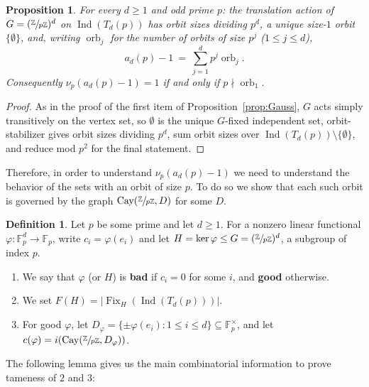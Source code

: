 \documentclass{article}
\theoremstyle{plain}
\newtheorem{proposition}[theorem]{Proposition}
\theoremstyle{definition}
\newtheorem{definition}[theorem]{Definition}
\theoremstyle{remark}
\newcommand{\Z}{\mathbb{Z}}
\newcommand{\F}{\mathbb{F}}
\newcommand{\quot}[2]{\sfrac{#1}{#2}}
\DeclareMathOperator{\Fix}{Fix}
\DeclareMathOperator{\Cay}{Cay}
\DeclareMathOperator{\Ind}{Ind}
\DeclareMathOperator{\orb}{orb}
\begin{document}
\begin{proposition}\label{prop:decompgeneral}
For every $d\ge1$ and odd prime $p$: the translation action of $G=(\quot{\Z}{p\Z})^d$ on $\Ind(T_d(p))$ has orbit sizes dividing $p^d$, a unique size-$1$ orbit $\{\emptyset\}$, and, writing $\orb_j$ for the number of orbits of size $p^j$ ($1\le j\le d$),
\[
a_d(p)-1\ =\ \sum_{j=1}^dp^j\orb_j.
\]
Consequently $\nu_p(a_d(p)-1)=1$ if and only if $p\nmid \orb_1$.
\end{proposition}
\begin{proof}
As in the proof of the first item of Proposition~\ref{prop:Gauss},  $G$ acts simply transitively on the vertex set, so $\emptyset$ is the unique $G$-fixed independent set, orbit-stabilizer gives orbit sizes dividing $p^d$, sum orbit sizes over $\Ind(T_d(p))\setminus\{\emptyset\}$, and reduce mod $p^2$ for the final statement.
\end{proof}

Therefore, in order to understand $\nu_p(a_d(p)-1)$ we need to understand the behavior of the sets with an orbit of size $p$. To do so we show that each such orbit is governed by the graph $\Cay(\sfrac{\Z}{p\Z},D)$ for some $D$. 


\begin{definition}
Let $p$ be some prime and let $d \geq 1$. For a nonzero linear functional $\varphi:\F_p^d\to\F_p$, write $c_i=\varphi(e_i)$ and let $H=\ker\varphi\le G=(\quot\Z{p\Z})^d$, a subgroup of index $p$.
\begin{enumerate}
    \item We say that $\varphi$ (or $H$) is \textbf{bad} if $c_i=0$ for some $i$, and \textbf{good} otherwise. 
    \item We set $F(H)=|\Fix_H(\Ind(T_d(p)))|$.
    \item For good $\varphi$, let $D_\varphi=\{\pm\varphi(e_i):1\le i\le d\}\subseteq\F_p^\times$, and let $c(\varphi)=i(\Cay(\sfrac{\Z}{p\Z}, D_\varphi))$. 
\end{enumerate}
    
\end{definition}

The following lemma gives us the main combinatorial information to prove tameness of $2$ and $3$:
\end{document}
